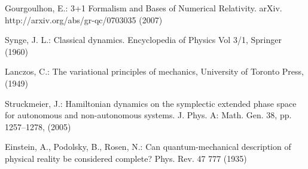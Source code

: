 \documentclass[smallextended]{svjour3}
\numberwithin{equation}{section}
\begin{document}
\begin{thebibliography}{0}
 Gourgoulhon, E.: 3+1 Formalism and Bases of Numerical Relativity. arXiv. http://arxiv.org/abs/gr-qc/0703035 (2007)

 Synge, J. L.: Classical dynamics. Encyclopedia of Physics Vol 3/1, Springer (1960)

 Lanczos, C.: The variational principles of mechanics, University of Toronto Press, (1949)

 Struckmeier, J.: Hamiltonian dynamics on the symplectic extended phase space for autonomous and non-autonomous systems. J. Phys. A: Math. Gen. 38, pp. 1257--1278, (2005)

 Einstein, A., Podolsky, B.,  Rosen, N.: Can quantum-mechanical description of physical reality be considered complete? Phys. Rev. 47 777 (1935)

\end{thebibliography}
\end{document}
